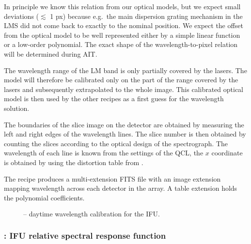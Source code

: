 In principle we know this relation from our optical models, but we expect small
deviations ($\lesssim$ 1 px) because e.g.\ the main dispersion grating mechanism
in the \ac{LMS} did not come back to exactly to the nominal position.
We expect the offset from the optical model to be well represented either by a
simple linear function or a low-order polynomial.
The exact shape of the wavelength-to-pixel relation will be determined during
\ac{AIT}.

The wavelength range of the LM band is only partially covered by the lasers.
The model will therefore be calibrated only on the part of the range covered by
the lasers and subsequently extrapolated to the whole image.
This calibrated optical model is then used by the other recipes as a first
guess for the wavelength solution.

The boundaries of the slice image on the detector are obtained by
measuring the left and right edges of the wavelength lines.
The slice number is then obtained by counting the
slices according to the optical design of the spectrograph.
The wavelength of each line is known from the settings of the \ac{QCL}, the $x$
coordinate is obtained by
using the distortion table from .

The recipe produces a multi-extension FITS file with an image
extension mapping wavelength across each detector in the array.
A table extension holds the polynomial coefficients.



\begin{figure}[hb]
    \centering
    \def \globalscale {0.700000}
    \fontsize{10}{12}\selectfont
    
  \caption[Recipe: ]{ --
    daytime wavelength calibration for the IFU.}
  \label{fig:metis_ifu_wavecal}
\end{figure}


\clearpage
\subsubsection{: IFU relative spectral response function}
\label{sssec:ifu_rsrf}
\label{rec:metis_ifu_rsrf}


